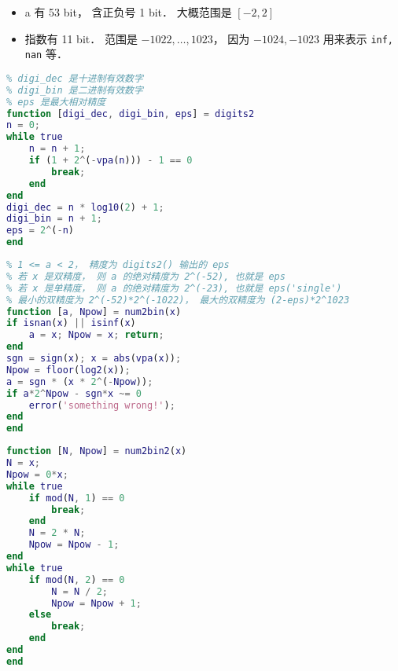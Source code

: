 
\begin{itemize}
\item a 有 53 bit， 含正负号 1 bit． 大概范围是 $[-2,2]$
\item 指数有 11 bit． 范围是 $-1022,\dots,1023$， 因为 $-1024, -1023$ 用来表示 \verb|inf, nan| 等．
\end{itemize}

\begin{lstlisting}[language=matlab, caption=digits2.m]
% 求当前 vpa 变精度计算的有效数字
% digi_dec 是十进制有效数字
% digi_bin 是二进制有效数字
% eps 是最大相对精度
function [digi_dec, digi_bin, eps] = digits2
n = 0;
while true
    n = n + 1;
    if (1 + 2^(-vpa(n))) - 1 == 0
        break;
    end
end
digi_dec = n * log10(2) + 1;
digi_bin = n + 1;
eps = 2^(-n)
end
\end{lstlisting}

\begin{lstlisting}[language=matlab, caption=num2bin.m]
% x = a*2^Npw (exactly)
% 1 <= a < 2， 精度为 digits2() 输出的 eps
% 若 x 是双精度， 则 a 的绝对精度为 2^(-52), 也就是 eps
% 若 x 是单精度， 则 a 的绝对精度为 2^(-23), 也就是 eps('single')
% 最小的双精度为 2^(-52)*2^(-1022)， 最大的双精度为 (2-eps)*2^1023
function [a, Npow] = num2bin(x)
if isnan(x) || isinf(x)
    a = x; Npow = x; return;
end
sgn = sign(x); x = abs(vpa(x));
Npow = floor(log2(x));
a = sgn * (x * 2^(-Npow));
if a*2^Npow - sgn*x ~= 0
    error('something wrong!');
end
end
\end{lstlisting}

\begin{lstlisting}[language=matlab, caption=num2bin2.m]
% 精确解出 x = N*2^Npow， 其中 N 是绝对值最小的整数
function [N, Npow] = num2bin2(x)
N = x;
Npow = 0*x;
while true
    if mod(N, 1) == 0
        break;
    end
    N = 2 * N;
    Npow = Npow - 1;
end
while true
    if mod(N, 2) == 0
        N = N / 2;
        Npow = Npow + 1;
    else
        break;
    end
end
end
\end{lstlisting}
